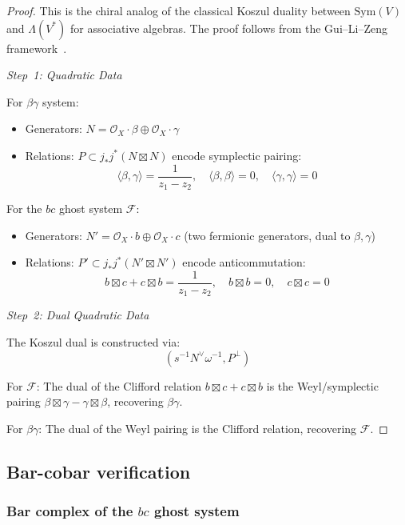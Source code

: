 \begin{proof}
This is the chiral analog of the classical Koszul duality between $\text{Sym}(V)$ and $\Lambda(V^*)$ 
for associative algebras. The proof follows from the Gui--Li--Zeng framework~\cite{GLZ22}.

\emph{Step~1: Quadratic Data}

For $\beta\gamma$ system:
\begin{itemize}
\item Generators: $N = \mathcal{O}_X \cdot \beta \oplus \mathcal{O}_X \cdot \gamma$
\item Relations: $P \subset j_* j^*(N \boxtimes N)$ encode symplectic pairing:
\[\langle \beta, \gamma \rangle = \frac{1}{z_1 - z_2}, \quad \langle \beta, \beta \rangle = 0, \quad \langle \gamma, \gamma \rangle = 0\]
\end{itemize}

For the $bc$ ghost system $\mathcal{F}$:
\begin{itemize}
\item Generators: $N' = \mathcal{O}_X \cdot b \oplus \mathcal{O}_X \cdot c$ (two fermionic generators, dual to $\beta, \gamma$)
\item Relations: $P' \subset j_* j^*(N' \boxtimes N')$ encode anticommutation:
\[b \boxtimes c + c \boxtimes b = \frac{1}{z_1 - z_2}, \quad b \boxtimes b = 0, \quad c \boxtimes c = 0\]
\end{itemize}

\emph{Step~2: Dual Quadratic Data}

The Koszul dual is constructed via:
\[(s^{-1}N^{\vee}\omega^{-1}, P^{\perp})\]

For $\mathcal{F}$: The dual of the Clifford relation $b \boxtimes c + c \boxtimes b$ is the Weyl/symplectic
pairing $\beta \boxtimes \gamma - \gamma \boxtimes \beta$, recovering $\beta\gamma$.

For $\beta\gamma$: The dual of the Weyl pairing is the Clifford relation, recovering $\mathcal{F}$.
\end{proof}

\subsection{Bar-cobar verification}
\label{subsec:bar-cobar-verification}

\subsubsection{\texorpdfstring{Bar complex of the $bc$ ghost system}{Bar complex of the bc ghost system}}

